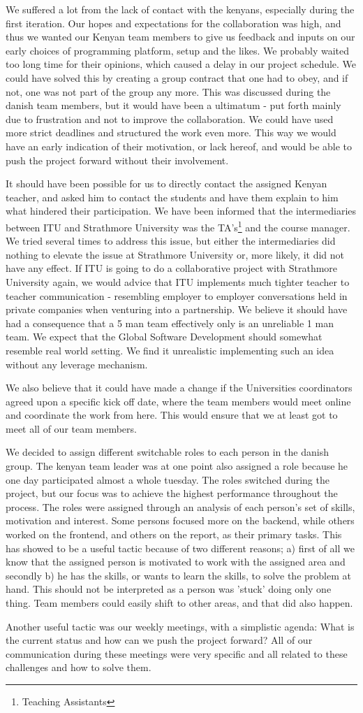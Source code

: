 We suffered a lot from the lack of contact with the kenyans, especially during the first iteration. Our hopes and expectations for the collaboration was high, and thus we wanted our Kenyan team members to give us feedback and inputs on our early choices of programming platform, setup and the likes. We probably waited too long time for their opinions, which caused a delay in our project schedule. We could have solved this by creating a group contract that one had to obey, and if not, one was not part of the group any more. This was discussed during the danish team members, but it would have been a ultimatum - put forth mainly due to frustration and not to improve the collaboration. We could have used more strict deadlines and structured the work even more. This way we would have an early indication of their motivation, or lack hereof, and would be able to push the project forward without their involvement. 

It should have been possible for us to directly contact the assigned Kenyan teacher, and asked him to contact the students and have them explain to him what hindered their participation. We have been informed that the intermediaries between ITU and Strathmore University was the TA's\footnote{Teaching Assistants} and the course manager. We tried several times to address this issue, but either the intermediaries did nothing to elevate the issue at Strathmore University or, more likely, it did not have any effect. If ITU is going to do a collaborative project with Strathmore University again, we would advice that ITU implements much tighter teacher to teacher communication - resembling employer to employer conversations held in private companies when venturing into a partnership. We believe it should have had a consequence that a 5 man team effectively only is an unreliable 1 man team. We expect that the Global Software Development should somewhat resemble real world setting. We find it unrealistic implementing such an idea without any leverage mechanism.

We also believe that it could have made a change if the Universities coordinators agreed upon a specific kick off date, where the team members would meet online and coordinate the work from here. This would ensure that we at least got to meet all of our team members. 

We decided to assign different switchable roles to each person in the danish group. The kenyan team leader was at one point also assigned a role because he one day participated almost a whole tuesday. The roles switched during the project, but our focus was to achieve the highest performance throughout the process. The roles were assigned through an analysis of each person's set of skills, motivation and interest. Some persons focused more on the backend, while others worked on the frontend, and others on the report, as their primary tasks. This has showed to be a useful tactic because of two different reasons; a) first of all we know that the assigned person is motivated to work with the assigned area and secondly b) he has the skills, or wants to learn the skills, to solve the problem at hand. This should not be interpreted as a person was 'stuck' doing only one thing. Team members could easily shift to other areas, and that did also happen.

Another useful tactic was our weekly meetings, with a simplistic agenda: What is the current status and how can we push the project forward? All of our communication during these meetings were very specific and all related to these challenges and how to solve them.